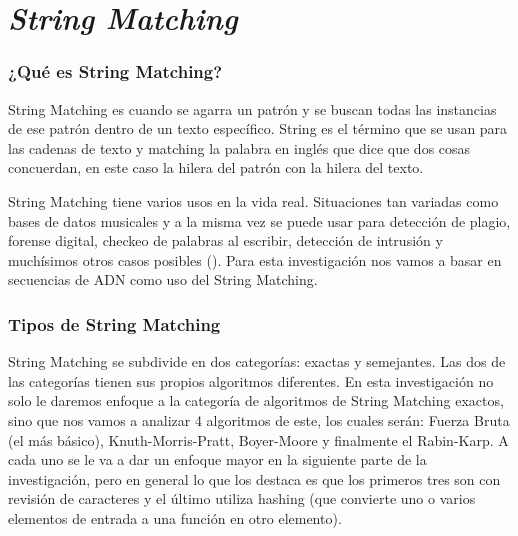 \part*{\textit{String Matching}}%

\section*{¿Qué es String Matching?}

\quad String Matching es cuando se agarra un patrón y se buscan todas las instancias de ese patrón dentro de un texto específico. String es el término que se usan para las cadenas de texto y matching la palabra en inglés que dice que dos cosas concuerdan, en este caso la hilera del patrón con la hilera del texto.

\quad String Matching tiene varios usos en la vida real. Situaciones tan variadas como bases de datos musicales  y a la misma vez se puede usar para detección de plagio, forense digital, checkeo de palabras al escribir, detección de intrusión y muchísimos otros casos posibles (\cite{GeeksForGeekdsSM}). Para esta investigación nos vamos a basar en secuencias de ADN como uso del String Matching.

\section*{Tipos de String Matching}

\quad String Matching se subdivide en dos categorías: exactas y semejantes. Las dos de las categorías tienen sus propios algoritmos diferentes. En esta investigación no solo le daremos enfoque a la categoría de algoritmos de String Matching exactos, sino que nos vamos a analizar 4 algoritmos de este, los cuales serán: Fuerza Bruta (el más básico), Knuth-Morris-Pratt, Boyer-Moore y finalmente el Rabin-Karp. A cada uno se le va a dar un enfoque mayor en la siguiente parte de la investigación, pero en general lo que los destaca es que los primeros tres son con revisión de caracteres y el último utiliza hashing (que convierte uno o varios elementos de entrada a una función en otro elemento).
